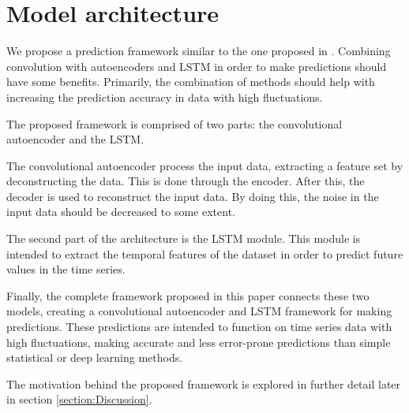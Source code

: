 \section{Model architecture}
\label{section:Architecture:Model}

We propose a prediction framework similar to the one proposed in \cite{Zhao2019}.
Combining convolution with autoencoders and LSTM in order to make predictions should have some benefits.
Primarily, the combination of methods should help with increasing the prediction accuracy in data with high fluctuations.

The proposed framework is comprised of two parts: the convolutional autoencoder and the LSTM.


The convolutional autoencoder process the input data, extracting a feature set by deconstructing the data.
This is done through the encoder. After this, the decoder is used to reconstruct the input data.
By doing this, the noise in the input data should be decreased to some extent.

The second part of the architecture is the LSTM module.
This module is intended to extract the temporal features of the dataset
in order to predict future values in the time series.


Finally, the complete framework proposed in this paper connects these two models,
creating a convolutional autoencoder and LSTM framework for making predictions.
These predictions are intended to function on time series data with high fluctuations,
making accurate and less error-prone predictions than simple statistical or deep learning methods.


The motivation behind the proposed framework is explored in further detail later in section \ref{section:Discussion}.

